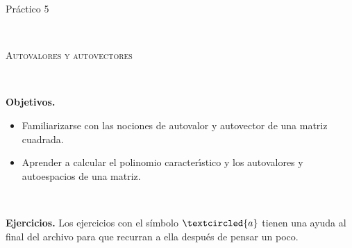 \documentclass[12pt]{amsart}
\begin{document}
	
	
	\centerline{\Large{Pr\' actico 5}}
	
	\
	
	\centerline{\textsc{Autovalores y autovectores}}
	
	\
	
	\noindent \textbf{Objetivos.} 
	
\begin{itemize}
\item Familiarizarse con las nociones de autovalor y autovector de una matriz cuadrada.

\item Aprender a calcular el polinomio caracter\' \i stico y los autovalores y autoespacios de una matriz.
\end{itemize}
	
	\
	
	\noindent \textbf{Ejercicios.} Los ejercicios con el s\'imbolo $\textcircled{a}$ tienen una ayuda al final del archivo para que recurran a ella despu\'es de pensar un poco.
\end{document}

